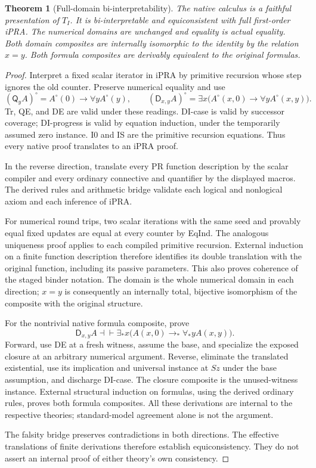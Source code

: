 \documentclass[11pt,letterpaper]{article}
\newtheorem{theorem}{Theorem}[section]
\theoremstyle{definition}\newtheorem{definition}[theorem]{Definition}
\theoremstyle{remark}\newtheorem{remark}[theorem]{Remark}
\newcommand{\D}{\mathsf D}
\newcommand{\Q}{\mathsf Q}
\begin{document}
\begin{theorem}[Full-domain bi-interpretability]
\label{thm:new-equivalence}
The native calculus is a faithful presentation of $T_I$. It is
bi-interpretable and equiconsistent with full first-order iPRA. The
numerical domains are unchanged and equality is actual equality.
Both domain composites are internally isomorphic to the identity by
the relation $x=y$. Both formula composites are derivably equivalent
to the original formulas.
\end{theorem}
\begin{proof}
Interpret a fixed scalar iterator in iPRA by primitive recursion whose
step ignores the old counter. Preserve numerical equality and use
\[
 (\Q_yA)^\circ=A^\circ(0)\to\forall y A^\circ(y),\qquad
 (\D_{x,y}A)^\circ=
 \exists x\bigl(A^\circ(x,0)\to\forall y A^\circ(x,y)\bigr).
\]
Tr, QE, and DE are valid under these readings. DI-case is valid by
successor coverage; DI-progress is valid by equation induction, under
the temporarily assumed zero instance. I0 and IS are the primitive
recursion equations. Thus every native proof translates to an iPRA proof.

In the reverse direction, translate every PR function description by
the scalar compiler and every ordinary connective and quantifier by
the displayed macros. The derived rules and arithmetic bridge validate
each logical and nonlogical axiom and each inference of iPRA.

For numerical round trips, two scalar iterations with the same seed
and provably equal fixed updates are equal at every counter by EqInd.
The analogous uniqueness proof applies to each compiled primitive
recursion. External induction on a finite function description therefore
identifies its double translation with the original function, including
its passive parameters. This also proves coherence of the staged binder
notation. The domain is the whole numerical domain in each direction;
$x=y$ is consequently an internally total, bijective isomorphism of
the composite with the original structure.

For the nontrivial native formula composite, prove
\[
 \D_{x,y}A\dashv\vdash
 \exists_*x\bigl(A(x,0)\to_*\forall_*y A(x,y)\bigr).
\]
Forward, use DE at a fresh witness, assume the base, and specialize
the exposed closure at an arbitrary numerical argument. Reverse,
eliminate the translated existential, use its implication and universal
instance at $Sz$ under the base assumption, and discharge DI-case.
The closure composite is the unused-witness instance. External
structural induction on formulas, using the derived ordinary rules,
proves both formula composites. All these derivations are internal to
the respective theories; standard-model agreement alone is not the
argument.

The falsity bridge preserves contradictions in both directions.
The effective translations of finite derivations therefore establish
equiconsistency. They do not assert an internal proof of either
theory's own consistency.
\end{proof}
\end{document}
